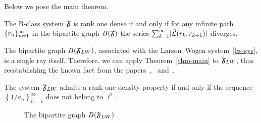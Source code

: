 \documentclass[12pt,oneside,a4paper]{amsart}
\begin{document}
    \bigskip
    Below we pose the main theorem.
    \begin{theorem}
      \label{thm-main}
      The B-class system $\mathfrak{F}$ is rank one dense if and only if
        for any infinite path $\{{r}_n\}_{n=1}^\infty$ in the bipartite graph $B(\mathfrak{F})$
          the series $\sum_{k=1}^\infty\lvert\hat{\mathcal{L}}(r_k, r_{k+1})\rvert$ diverges.
    \end{theorem}
    The bipartite graph $B(\mathfrak{F}_{LW})$, associated with the Larson--Wogen system~\eqref{lw-sys},
      is a single ray itself.
    Therefore, we can apply Theorem~\ref{thm-main} to $\mathfrak{F}_{LW}$, thus reestablishing
      the known fact from the papers~\cite{katavolos},~\cite{larson} and~\cite{argyroslambrou}.
    \begin{corol*}
      The system $\mathfrak{F}_{LW}$ admits a rank one density property if and only if
        the sequence $\left\{1/a_n\right\}_{n=1}^\infty$ does not belong to $\ell^1$.
    \end{corol*}
    \begin{figure}
      \begin{center}
      \caption{The bipartite graph $B(\mathfrak{F}_{LW})$ } \label{lw-bgraph}
      \end{center}
    \end{figure}
\end{document}
